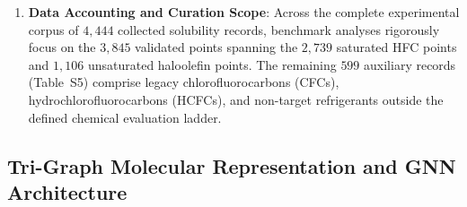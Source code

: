 \begin{enumerate}
    \item \textbf{Data Accounting and Curation Scope}: 
    Across the complete experimental corpus of $4,444$ collected solubility records, benchmark analyses rigorously focus on the $3,845$ validated points spanning the $2,739$ saturated HFC points and $1,106$ unsaturated haloolefin points. The remaining $599$ auxiliary records (Table~S5) comprise legacy chlorofluorocarbons (CFCs), hydrochlorofluorocarbons (HCFCs), and non-target refrigerants outside the defined chemical evaluation ladder.
\end{enumerate}

\subsection{Tri-Graph Molecular Representation and GNN Architecture}
\label{subsec:trigraph_gnn}

